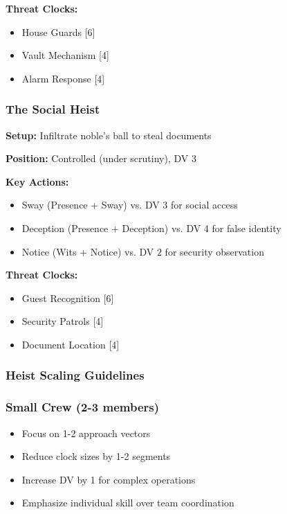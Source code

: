 \documentclass[11pt]{article}
\begin{document}
\textbf{Threat Clocks:}
\begin{itemize}
    \item House Guards [6]
    \item Vault Mechanism [4] 
    \item Alarm Response [4]
\end{itemize}

\subsubsection{The Social Heist}

\textbf{Setup:} Infiltrate noble's ball to steal documents

\textbf{Position:} Controlled (under scrutiny), DV 3

\textbf{Key Actions:}
\begin{itemize}
    \item Sway (Presence + Sway) vs. DV 3 for social access
    \item Deception (Presence + Deception) vs. DV 4 for false identity
    \item Notice (Wits + Notice) vs. DV 2 for security observation
\end{itemize}

\textbf{Threat Clocks:}
\begin{itemize}
    \item Guest Recognition [6]
    \item Security Patrols [4]
    \item Document Location [4]
\end{itemize}

\subsubsection{Heist Scaling Guidelines}

\subsubsection{Small Crew (2-3 members)}

\begin{itemize}
    \item Focus on 1-2 approach vectors
    \item Reduce clock sizes by 1-2 segments
    \item Increase DV by 1 for complex operations
    \item Emphasize individual skill over team coordination
\end{itemize}
\end{document}
